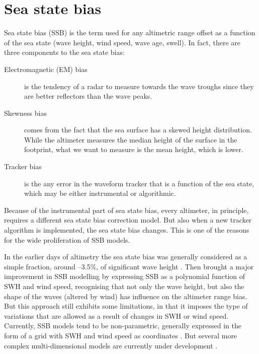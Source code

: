 \documentclass[a4paper,11pt,openany,natbib]{thesis}
\begin{document}
\section{Sea state bias}
\label{var:ssb}
Sea state bias (SSB) is the term used for any altimetric range offset as a function of the sea state (wave height, wind speed, wave age, swell). In fact, there are three components to the sea state bias:
\begin{description}
\item[Electromagnetic (EM) bias] is the tendency of a radar to measure towards the wave troughs since they are better reflectors than the wave peaks.
\item[Skewness bias] comes from the fact that the sea surface has a skewed height distribution. While the altimeter measures the median height of the surface in the footprint, what we want to measure is the mean height, which is lower.
\item[Tracker bias] is the any error in the waveform tracker that is a function of the sea state, which may be either instrumental or algorithmic.
\end{description}

Because of the instrumental part of sea state bias, every altimeter, in principle, requires a different sea state bias correction model. But also when a new tracker algorithm is implemented, the sea state bias changes. This is one of the reasons for the wide proliferation of SSB models. 

In the earlier days of altimetry the sea state bias was generally considered as a simple fraction, around --3.5\%, of significant wave height \citep{chelton1994}. Then \citet{gaspar1994a} brought a major improvement in SSB modelling by expressing SSB as a polynomial function of SWH and wind speed, recognising that not only the wave height, but also the shape of the waves (altered by wind) has influence on the altimeter range bias. But this approach still exhibits some limitations, in that it imposes the type of variations that are allowed as a result of changes in SWH or wind speed. Currently, SSB models tend to be non-parametric, generally expressed in the form of a grid with SWH and wind speed as coordinates \citep[e.g.,][]{gaspar1998b}. But several more complex multi-dimensional models are currently under development \citep[e.g.,][]{feng2010,tran2010}.
\end{document}
